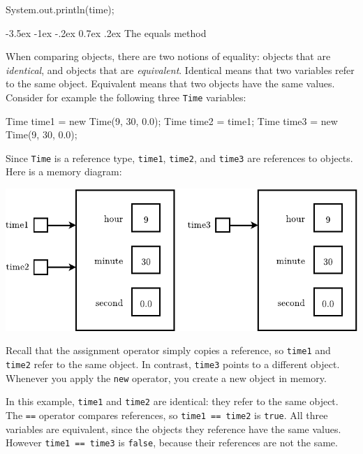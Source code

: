 \documentclass[12pt]{book}
\makeatletter
\renewcommand{\section}{\@startsection {section}{1}{\z@}%
    {-3.5ex \@plus -1ex \@minus -.2ex}%
    {0.7ex \@plus.2ex}%
    {\normalfont\Large\bfseries}}
\theoremstyle{exercise}
\newcommand{\java}[1]{\lstinline{#1}} %
\makeatother
\begin{document}
\begin{code}
    System.out.println(time);
\end{code}


\section{The equals method}


When comparing objects, there are two notions of equality: objects that are {\em identical}, and objects that are {\em equivalent}.
Identical means that two variables refer to the same object.
Equivalent means that two objects have the same values.
Consider for example the following three \java{Time} variables:

\begin{code}
    Time time1 = new Time(9, 30, 0.0);
    Time time2 = time1;
    Time time3 = new Time(9, 30, 0.0);
\end{code}

Since \java{Time} is a reference type, \java{time1}, \java{time2}, and \java{time3} are references to objects.
Here is a memory diagram:

\begin{center}
\includegraphics{figs/time2.pdf}
\end{center}

Recall that the assignment operator simply copies a reference, so \java{time1} and \java{time2} refer to the same object.
In contrast, \java{time3} points to a different object.
Whenever you apply the \java{new} operator, you create a new object in memory.

In this example, \java{time1} and \java{time2} are identical: they refer to the same object.
The \java{==} operator compares references, so \java{time1 == time2} is \java{true}.
All three variables are equivalent, since the objects they reference have the same values.
However \java{time1 == time3} is \java{false}, because their references are not the same.
\end{document}
